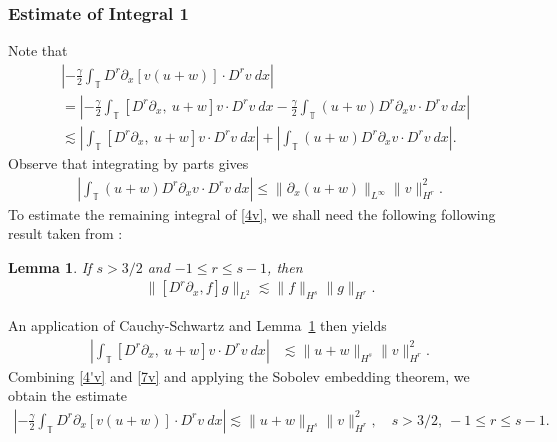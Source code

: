 \documentclass[12pt,reqno]{amsart}
\numberwithin{equation}{section}  %
\numberwithin{figure}{section}
\newcommand{\ci}{\mathbb{T}}
\newcommand{\p}{\partial}
\newtheorem{lemma}{Lemma}
\begin{document}
\subsubsection{Estimate of Integral 1} 
Note that
%
%
\begin{equation}
\begin{split}
& \left |  -\frac{\gamma}{2} \int_{\ci} D^r \p_x [v(u+w)] \cdot
D^r v \ dx \right |
\\
& =
\left |
-\frac{\gamma}{2} \int_{\ci} \left[ D^r \p_x, \ u+w \right]v \cdot
D^r v \ dx - \frac{\gamma}{2} \int_{\ci} (u+w) D^r
\p_x v \cdot D^r v\ dx
\right | \\
& \lesssim \left |
\int_{\ci} \left[ D^r \p_x, \ u+w \right]v \cdot
D^r v \ dx \right |
+ \left | \int_{\ci} (u+w) D^r \p_x v
\cdot D^r v\
dx \right |.
\label{4v}
\end{split}
\end{equation}
%
%
Observe that integrating by parts gives
%
%
\begin{equation}
\begin{split}
\left | \int_{\ci} (u+w) D^r \p_x v \cdot
D^r v \ dx \right |
\le \|\p_x (u+w)\|_{L^\infty}
\|v\|_{H^r}^2.
\label{4'v}
\end{split}
\end{equation}
%
%
%
%
To estimate the remaining integral of \eqref{4v}, we shall need the following
following result taken from \cite{Himonas:2010vp}:
%
\begin{lemma}
\label{cor1}
If $s > 3/2$ and $-1 \le r  \le s -1$, then
%
%
\begin{equation*}
\begin{split}
\|[D^r \p_x ,f]g\|_{L^2} \lesssim \|f\|_{H^s} \|g\|_{H^r}.
\end{split}
\end{equation*}
%
%
\end{lemma}
%
%
An application of 
Cauchy-Schwartz and Lemma~\ref{cor1} then yields 
%
%
\begin{equation}
\begin{split}
\left | \int_{\ci} [D^r \p_x, \ u+w] v
\cdot D^r v \ dx \right |
& \lesssim \|u+w\|_{H^s} 
\|v\|_{H^r}^2.
\label{7v}
\end{split}
\end{equation}
%
%
Combining \eqref{4'v} and \eqref{7v} and applying the Sobolev embedding 
theorem, we obtain the estimate
%
%
\begin{equation}
\begin{split}
\left |  -\frac{\gamma}{2} \int_{\ci} D^r \p_x [v(u+w)] \cdot
D^r v \ dx \right |
\lesssim \|u+w\|_{H^s} \|v\|_{H^r}^2, \quad s > 3/2, \ -1 \le r \le s-1.
\label{8v}
\end{split}
\end{equation}
%
%
\end{document}
